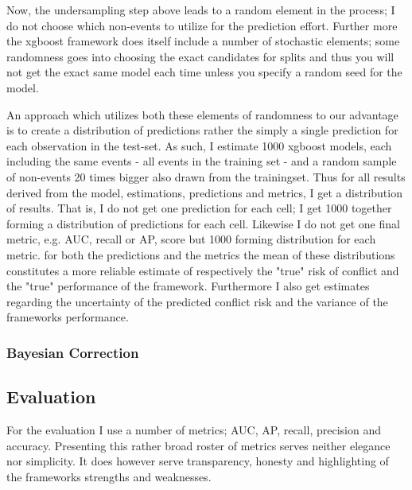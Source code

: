 \documentclass[a4paper]{article}
\begin{document}

Now, the undersampling step above leads to a random element in the process; I do not choose which non-events to utilize for the prediction effort. Further more the xgboost framework does itself include a number of stochastic elements; some randomness goes into choosing the exact candidates for splits and thus you will not get the exact same model each time unless you specify a random seed for the model. 


An approach which utilizes both these elements of randomness to our advantage is to create a distribution of predictions rather the simply a single prediction for each observation in the test-set. As such, I estimate 1000 xgboost models, each including the same events - all events in the training set - and a random sample of non-events 20 times bigger also drawn from the trainingset. Thus for all results derived from the model, estimations, predictions and metrics, I get a distribution of results. That is, I do not get one prediction for each cell; I get 1000 together forming a distribution of predictions for each cell. Likewise I do not get one final metric, e.g. AUC, recall or AP, score but 1000 forming distribution for each metric. for both the predictions and the metrics the mean of these distributions constitutes a more reliable estimate of respectively the "true" risk of conflict and the "true" performance of the framework. Furthermore I also get estimates regarding the uncertainty of the predicted conflict risk and the variance of the frameworks performance.\par

\subsubsection{Bayesian Correction}

\subsection{Evaluation}

For the evaluation I use a number of metrics; AUC, AP, recall, precision and accuracy. Presenting this rather broad roster of metrics serves neither elegance nor simplicity. It does however serve transparency, honesty and highlighting of the frameworks strengths and weaknesses.
\end{document}
